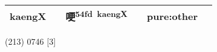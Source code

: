 \documentclass[14pt,a4paper]{scrartcl}
\begin{document}
\begin{longtable}[c]{@{}llllll@{}}
\begin{minipage}[t]{0.14\columnwidth}\raggedright\strut
kaengX
\strut\end{minipage} &
\begin{minipage}[t]{0.14\columnwidth}\raggedright\strut
\strut\end{minipage} &
\begin{minipage}[t]{0.14\columnwidth}\raggedright\strut
哽\textsuperscript{54fd~kaengX}
\strut\end{minipage} &
\begin{minipage}[t]{0.14\columnwidth}\raggedright\strut
\strut\end{minipage} &
\begin{minipage}[t]{0.14\columnwidth}\raggedright\strut
pure:other
\strut\end{minipage}\tabularnewline
\bottomrule
\end{longtable}

(213) 0746 {[}3{]}
\end{document}
